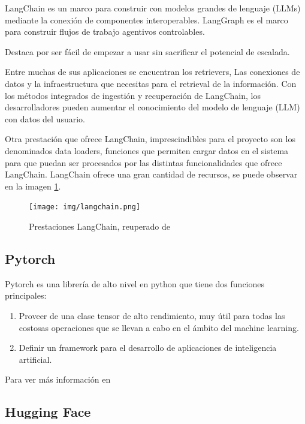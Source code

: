 LangChain es un marco para construir con modelos grandes de lenguaje (LLMs) mediante la conexión de componentes interoperables. LangGraph es el marco para construir flujos de trabajo agentivos controlables.

Destaca por ser fácil de empezar a usar sin sacrificar el potencial de escalada.

Entre muchas de sus aplicaciones se encuentran los retrievers, Las conexiones de datos y la infraestructura que necesitas para el retrieval de la información. Con los métodos integrados de ingestión y recuperación de LangChain, los desarrolladores pueden aumentar el conocimiento del modelo de lenguaje (LLM) con datos del usuario.

Otra prestación que ofrece LangChain, imprescindibles para el proyecto son los denominados data loaders, funciones que permiten cargar datos en el sistema para que puedan ser procesados por las distintas funcionalidades que ofrece LangChain.
LangChain ofrece una gran cantidad de recursos, se puede observar en la imagen \ref{fig:langchain}.

\begin{figure}[h]
    \centering
    \texttt{[image: img/langchain.png]}
    \caption{Prestaciones LangChain, reuperado de \cite{langchain_2022}}
    \label{fig:langchain}
\end{figure}

\subsection{Pytorch}

Pytorch es una librería de alto nivel en python que tiene dos funciones principales:

\begin{enumerate}
    \item Proveer de una clase tensor de alto rendimiento, muy útil para todas las costosas operaciones que se llevan a cabo en el ámbito del machine learning.
    
    \item  Definir un framework para el desarrollo de aplicaciones de inteligencia artificial.
\end{enumerate}

Para ver más información en \cite{pablo_huijse_heise_12_2022}

\subsection{Hugging Face}

